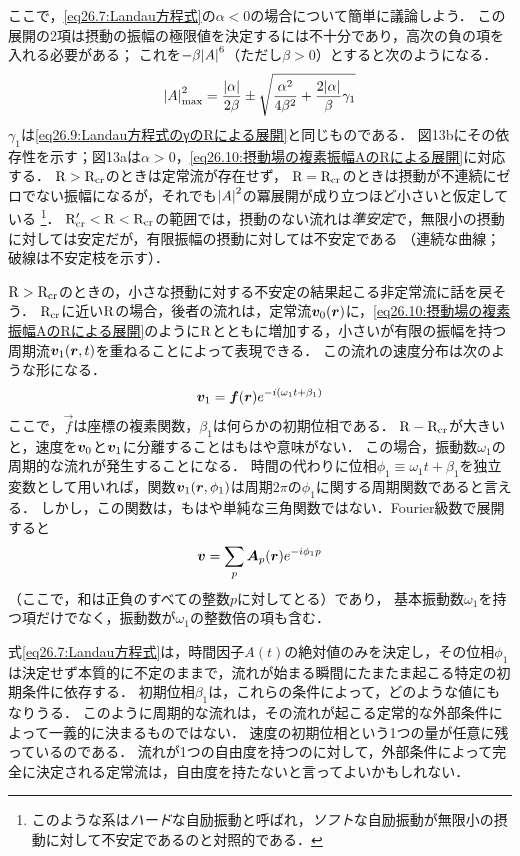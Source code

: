 ここで，\eqref{eq26.7:Landau方程式}の$\alpha<0$の場合について簡単に議論しよう．
この展開の2項は摂動の振幅の極限値を決定するには不十分であり，高次の負の項を入れる必要がある；
これを$-\beta\abs{A}^6$（ただし$\beta>0$）とすると次のようになる．
\begin{equation}
    \abs{A}_\textrm{max}^2 = \frac{\abs{\alpha}}{2\beta} \pm \sqrt{ \frac{\alpha^2}{4\beta^2} + \frac{2\abs{\alpha}}{\beta} \gamma_1 }
\end{equation}
$\gamma_1$は\eqref{eq26.9:Landau方程式のγのRによる展開}と同じものである．
図13bにその依存性を示す；図13aは$\alpha>0$，\eqref{eq26.10:摂動場の複素振幅AのRによる展開}に対応する．
$\mathrm{R}>\mathrm{R}_{\mathrm{cr}}$のときは定常流が存在せず，
$\mathrm{R}=\mathrm{R}_{\mathrm{cr}}$のときは摂動が不連続にゼロでない振幅になるが，それでも$\abs{A}^2$の冪展開が成り立つほど小さいと仮定している
\footnote{このような系は\emph{ハード}な自励振動と呼ばれ，\emph{ソフト}な自励振動が無限小の摂動に対して不安定であるのと対照的である．}．
$\mathrm{R}_{\mathrm{cr}}'<\mathrm{R}<\mathrm{R}_{\mathrm{cr}}$の範囲では，摂動のない流れは\emph{準安定}で，無限小の摂動に対しては安定だが，有限振幅の摂動に対しては不安定である
（連続な曲線；破線は不安定枝を示す）．



$\mathrm{R}>\mathrm{R}_{\mathrm{cr}}$のときの，小さな摂動に対する不安定の結果起こる非定常流に話を戻そう．
$\mathrm{R}_{\mathrm{cr}}$に近い$\mathrm{R}$の場合，後者の流れは，定常流$\vb*{v}_0(\vb*{r})$に，\eqref{eq26.10:摂動場の複素振幅AのRによる展開}のように$\mathrm{R}$とともに増加する，小さいが有限の振幅を持つ周期流$\vb*{v}_1(\vb*{r},t)$を重ねることによって表現できる．
この流れの速度分布は次のような形になる．
\begin{equation}
    \vb*{v}_1 = \vb*{f}(\vb*{r}) e^{-i(\omega_1t+\beta_1)}
\end{equation}
ここで，$\vec{f}$は座標の複素関数，$\beta_1$は何らかの初期位相である．
$\mathrm{R}-\mathrm{R}_{\mathrm{cr}}$が大きいと，速度を$\vb*{v}_0$と$\vb*{v}_1$に分離することはもはや意味がない．
この場合，振動数$\omega_1$の周期的な流れが発生することになる．
時間の代わりに位相$\phi_1 \equiv \omega_1t+\beta_1$を独立変数として用いれば，関数$\vb*{v}_1(\vb*{r},\phi_1)$は周期$2\pi$の$\phi_1$に関する周期関数であると言える．
しかし，この関数は，もはや単純な三角関数ではない．Fourier級数で展開すると
\begin{equation}
    \vb*{v} = \sum_p \vb*{A}_p(\vb*{r}) e^{-i\phi_1p}
\end{equation}
（ここで，和は正負のすべての整数$p$に対してとる）であり，
基本振動数$\omega_1$を持つ項だけでなく，振動数が$\omega_1$の整数倍の項も含む．


式\eqref{eq26.7:Landau方程式}は，時間因子$A(t)$の絶対値のみを決定し，その位相$\phi_1$は決定せず本質的に不定のままで，流れが始まる瞬間にたまたま起こる特定の初期条件に依存する．
初期位相$\beta_1$は，これらの条件によって，どのような値にもなりうる．
このように周期的な流れは，その流れが起こる定常的な外部条件によって一義的に決まるものではない．
速度の初期位相という1つの量が任意に残っているのである．
流れが1つの自由度を持つのに対して，外部条件によって完全に決定される定常流は，自由度を持たないと言ってよいかもしれない．

